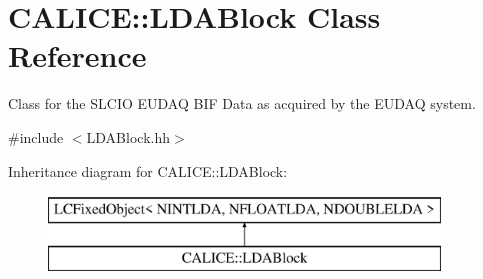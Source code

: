 \section{C\-A\-L\-I\-C\-E\-:\-:L\-D\-A\-Block Class Reference}
\label{classCALICE_1_1LDABlock}


Class for the S\-L\-C\-I\-O E\-U\-D\-A\-Q B\-I\-F Data as acquired by the E\-U\-D\-A\-Q system.  




{\ttfamily \#include $<$L\-D\-A\-Block.\-hh$>$}

Inheritance diagram for C\-A\-L\-I\-C\-E\-:\-:L\-D\-A\-Block\-:\begin{figure}[H]
\begin{center}
\leavevmode
\includegraphics[height=2.000000cm]{classCALICE_1_1LDABlock}
\end{center}
\end{figure}
